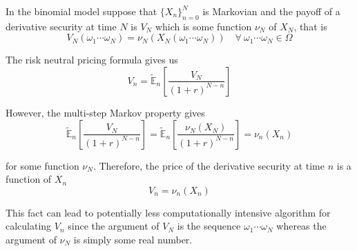 \documentclass[12pt]{article}
\newlength\tindent
\renewcommand{\indent}{\hspace*{\tindent}}
\newcommand{\E}{\mathbb E}
\begin{document}
\indent In the binomial model suppose that $\{X_n\}^N_{n = 0}$ is Markovian and the payoff of a derivative security at time $N$ is $V_N$ which is some function $\nu_N$ of  $X_N$, that is
\begin{equation*}
	V_N(\omega_1\cdots\omega_N) = \nu_N(X_N(\omega_1\cdots\omega_N)) \quad \forall~ \omega_1\cdots\omega_N \in \Omega
\end{equation*}

The risk neutral pricing formula gives us
\begin{equation*}
	V_n = \tilde{\E}_n \left[ \frac{V_N}{(1 + r)^{N - n}} \right]
\end{equation*}

However, the multi-step Markov property gives
\begin{equation*}
	\tilde{\E}_n \left[ \frac{V_N}{(1 + r)^{N - n}} \right] = \tilde{\E}_n \left[ \frac{ \nu_N(X_N) }{(1 + r)^{N - n}} \right] = \nu_n(X_n)
\end{equation*}

for some function $\nu_N$. Therefore, the price of the derivative security at time $n$ is a function of $X_n$
\begin{equation*}
	V_n = \nu_n(X_n)
\end{equation*}

\indent This fact can lead to potentially less computationally intensive algorithm for calculating $V_n$ since the argument of $V_N$ is the sequence $\omega_1\cdots\omega_N$ whereas the argument of $\nu_N$ is simply some real number.
\end{document}
